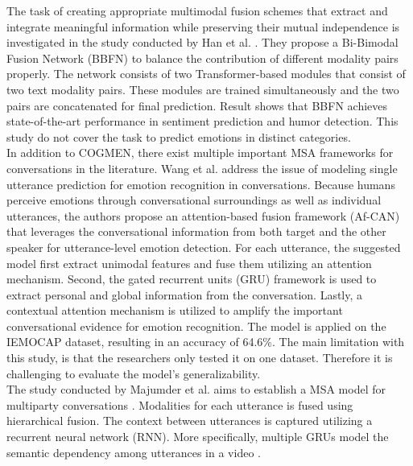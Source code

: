 The task of creating appropriate multimodal fusion schemes that extract and integrate meaningful information while preserving their mutual independence is investigated in the study conducted by Han et al. \cite{bimodal-fusion1-10.1145/3462244.3479919}. They propose a Bi-Bimodal Fusion Network (BBFN) to balance the contribution of different modality pairs properly. The network consists of two Transformer-based modules that consist of two text modality pairs. These modules are trained simultaneously and the two pairs are concatenated for final prediction. Result shows that BBFN achieves state-of-the-art performance in sentiment prediction and humor detection. This study do not cover the task to predict emotions in distinct categories.  \\

In addition to COGMEN, there exist multiple important MSA frameworks for conversations in the literature. Wang et al. \cite{Af-CAN_2021} address the issue of modeling single utterance prediction for emotion recognition in conversations. Because humans perceive emotions through conversational surroundings as well as individual utterances, the authors propose an attention-based fusion framework (Af-CAN) that leverages the conversational information from both target and the other speaker for utterance-level emotion detection. For each utterance, the suggested model first extract unimodal features and fuse them utilizing an attention mechanism. Second, the gated recurrent units (GRU) framework is used to extract personal and global information from the conversation. Lastly, a contextual attention mechanism is utilized to amplify the important conversational evidence for emotion recognition. The model is applied on the IEMOCAP dataset, resulting in an accuracy of 64.6\%. The main limitation with this study, is that the researchers only tested it on one dataset. Therefore it is challenging to evaluate the model's generalizability. \\

The study conducted by Majumder et al. \cite{DialogueRNN_MAJUMDER2018124} aims to establish a MSA model for multiparty conversations \cite{Af-CAN_2021}. Modalities for each utterance is fused using hierarchical fusion. The context between utterances is captured utilizing a recurrent neural network (RNN). More specifically, multiple GRUs model the semantic dependency among utterances in a video \cite{DialogueRNN_MAJUMDER2018124}. \\


